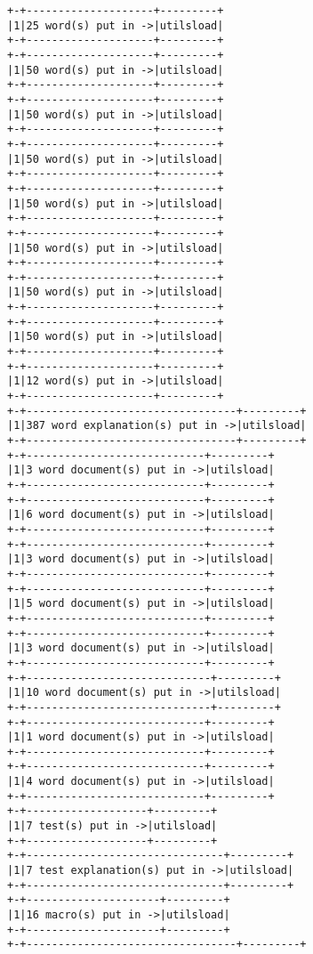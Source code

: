\documentclass[11pt,letter,landscape]{article}
\begin{document}
    \begin{Verbatim}[commandchars=\\\{\}]
+-+--------------------+---------+
|1|25 word(s) put in ->|utilsload|
+-+--------------------+---------+
+-+--------------------+---------+
|1|50 word(s) put in ->|utilsload|
+-+--------------------+---------+
+-+--------------------+---------+
|1|50 word(s) put in ->|utilsload|
+-+--------------------+---------+
+-+--------------------+---------+
|1|50 word(s) put in ->|utilsload|
+-+--------------------+---------+
+-+--------------------+---------+
|1|50 word(s) put in ->|utilsload|
+-+--------------------+---------+
+-+--------------------+---------+
|1|50 word(s) put in ->|utilsload|
+-+--------------------+---------+
+-+--------------------+---------+
|1|50 word(s) put in ->|utilsload|
+-+--------------------+---------+
+-+--------------------+---------+
|1|50 word(s) put in ->|utilsload|
+-+--------------------+---------+
+-+--------------------+---------+
|1|12 word(s) put in ->|utilsload|
+-+--------------------+---------+
+-+---------------------------------+---------+
|1|387 word explanation(s) put in ->|utilsload|
+-+---------------------------------+---------+
+-+----------------------------+---------+
|1|3 word document(s) put in ->|utilsload|
+-+----------------------------+---------+
+-+----------------------------+---------+
|1|6 word document(s) put in ->|utilsload|
+-+----------------------------+---------+
+-+----------------------------+---------+
|1|3 word document(s) put in ->|utilsload|
+-+----------------------------+---------+
+-+----------------------------+---------+
|1|5 word document(s) put in ->|utilsload|
+-+----------------------------+---------+
+-+----------------------------+---------+
|1|3 word document(s) put in ->|utilsload|
+-+----------------------------+---------+
+-+-----------------------------+---------+
|1|10 word document(s) put in ->|utilsload|
+-+-----------------------------+---------+
+-+----------------------------+---------+
|1|1 word document(s) put in ->|utilsload|
+-+----------------------------+---------+
+-+----------------------------+---------+
|1|4 word document(s) put in ->|utilsload|
+-+----------------------------+---------+
+-+-------------------+---------+
|1|7 test(s) put in ->|utilsload|
+-+-------------------+---------+
+-+-------------------------------+---------+
|1|7 test explanation(s) put in ->|utilsload|
+-+-------------------------------+---------+
+-+---------------------+---------+
|1|16 macro(s) put in ->|utilsload|
+-+---------------------+---------+
+-+---------------------------------+---------+

\end{Verbatim}
\end{document}
